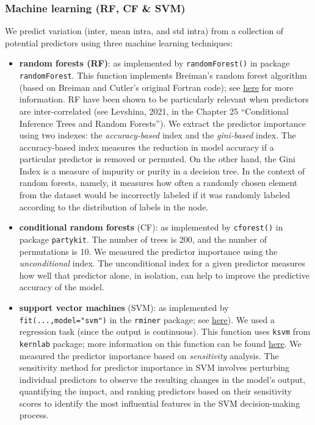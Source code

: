 \documentclass[
]{article}
\begin{document}
\hypertarget{machine-learning-rf-cf-svm}{%
\subsubsection{Machine learning (RF, CF \&
SVM)}\label{machine-learning-rf-cf-svm}}

We predict variation (inter, mean intra, and std intra) from a
collection of potential predictors using three machine learning
techniques:

\begin{itemize}
\item
  \textbf{random forests (RF)}: as implemented by
  \texttt{randomForest()} in package \texttt{randomForest}. This
  function implements Breiman's random forest algorithm (based on
  Breiman and Cutler's original Fortran code); see
  \href{https://www.rdocumentation.org/packages/randomForest/versions/4.7-1.1/topics/randomForest}{here}
  for more information. RF have been shown to be particularly relevant
  when predictors are inter-correlated (see Levshina, 2021, in the
  Chapter 25 ``Conditional Inference Trees and Random Forests''). We
  extract the predictor importance using two indexes: the
  \emph{accuracy-based} index and the \emph{gini-based} index. The
  accuracy-based index measures the reduction in model accuracy if a
  particular predictor is removed or permuted. On the other hand, the
  Gini Index is a measure of impurity or purity in a decision tree. In
  the context of random forests, namely, it measures how often a
  randomly chosen element from the dataset would be incorrectly labeled
  if it was randomly labeled according to the distribution of labels in
  the node.
\item
  \textbf{conditional random forests} (CF): as implemented by
  \texttt{cforest()} in package \texttt{partykit}. The number of trees
  is 200, and the number of permutations is 10. We measured the
  predictor importance using the \emph{unconditional} index. The
  unconditional index for a given predictor measures how well that
  predictor alone, in isolation, can help to improve the predictive
  accuracy of the model.
\item
  \textbf{support vector machines} (SVM): as implemented by
  \texttt{fit(...,model="svm")} in the \texttt{rminer} package; see
  \href{https://rdrr.io/cran/rminer/man/fit.html}{here}). We used a
  regression task (since the output is continuous). This function uses
  \texttt{ksvm} from \texttt{kernlab} package; more information on this
  function can be found
  \href{https://www.rdocumentation.org/packages/kernlab/versions/0.9-32/topics/ksvm}{here}.
  We measured the predictor importance based on \emph{sensitivity}
  analysis. The sensitivity method for predictor importance in SVM
  involves perturbing individual predictors to observe the resulting
  changes in the model's output, quantifying the impact, and ranking
  predictors based on their sensitivity scores to identify the most
  influential features in the SVM decision-making process.
\end{itemize}
\end{document}
